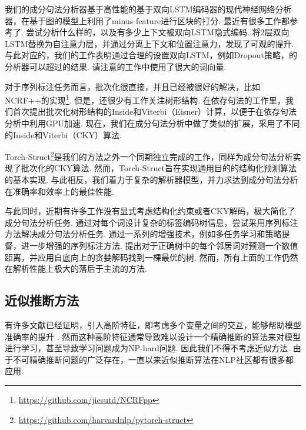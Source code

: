 我们的成分句法分析器基于高性能的基于双向LSTM编码器\citep{stern-etal-2017-minimal}的现代神经网络分析器，在基于图的模型上利用了minus feature\citep{cross-huang-2016-span}进行区块的打分.
最近有很多工作都参考了\citet{stern-etal-2017-minimal}.
\citet{gaddy-etal-2018-whats}尝试分析什么样的，以及有多少上下文被双向LSTM隐式编码.
\citet{kitaev-klein-2018-constituency}将2层双向LSTM替换为自注意力层，并通过分离上下文和位置注意力，发现了可观的提升.
与此对应的，我们的工作表明通过合理的设置双向LSTM，例如Dropout策略，\citet{stern-etal-2017-minimal}的分析器可以超过\citet{kitaev-klein-2018-constituency}的结果.
请注意\citet{kitaev-klein-2018-constituency}的工作中使用了很大的词向量.

对于序列标注任务而言，批次化很直接，并且已经被很好的解决，比如NCRF++的实现\footnote{\url{https://github.com/jiesutd/NCRFpp}}.
但是，还很少有工作关注树形结构.
在依存句法的工作里，我们首次提出批次化树形结构的Inside和Viterbi（Eisner）计算，以便于在依存句法分析中利用GPU加速\citep{zhang-etal-2020-efficient}.
现在，我们在成分句法分析中做了类似的扩展，采用了不同的Inside和Viterbi（CKY）算法.

Torch-Struct\footnote{\url{https://github.com/harvardnlp/pytorch-struct}}\citep{rush-2020-torch}是我们的方法之外一个同期独立完成的工作，同样为成分句法分析实现了批次化的CKY算法.
然而，Torch-Struct旨在实现通用目的的结构化预测算法的基本实现.
与此相反，我们着力于复杂的解析器模型，并力求达到成分句法分析在准确率和效率上的最佳性能.

与此同时，近期有许多工作没有显式考虑结构化约束或者CKY解码，极大简化了成分句法分析任务.
\citet{gomez-rodriguez-vilares-2018-constituent}通过对每个词设计复杂的标签编码树信息，尝试采用序列标注方法解决成分句法分析任务.
\citet{vilares-etal-2019-better}通过一系列的增强技术，例如多任务学习和策略提督，进一步增强的序列标注方法.
\citet{shen-etal-2018-straight}提出对于正确树中的每个邻居词对预测一个数值距离，并应用自底向上的贪婪解码找到一棵最优的树.
然而，所有上面的工作仍然在解析性能上极大的落后于主流的方法.

\subsection{近似推断方法}
有许多文献已经证明，引入高阶特征，即考虑多个变量之间的交互，能够帮助模型准确率的提升
\citep{mcdonald-pereira-2006-online,carreras-2007-experiments,koo-collins-2010-efficient,ma-zhao-2012-fourth}.
然而这种高阶特征通常导致难以设计一个精确推断的算法来对模型进行学习，甚至导致学习问题成为NP-hard问题\citep{mcdonald-pereira-2006-online}.
因此我们不得不考虑近似方法.
由于不可精确推断问题的广泛存在，一直以来近似推断算法在NLP社区都有很多都应用.

